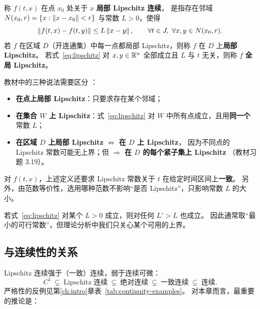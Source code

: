 \begin{definition}[局部 Lipschitz]\label{def:local-lipschitz}
  称 $f(t,x)$ 在点 $x_0$ 处关于 $x$ \textbf{局部 Lipschitz 连续}，
  是指存在邻域 $N(x_0,r)=\{x:\left\lVert x-x_0\right\rVert<r\}$ 与常数 $L>0$，使得
  \begin{equation}\label{eq:lipschitz}
    \left\lVert f(t,x)-f(t,y)\right\rVert\le L\left\lVert x-y\right\rVert,
    \qquad \forall t\in J,\ \forall x,y\in N(x_0,r).
  \end{equation}
  若 $f$ 在区域 $D$（开连通集）中每一点都局部 Lipschitz，则称 $f$ 在 $D$ 上\textbf{局部 Lipschitz}。
  若式~\eqref{eq:lipschitz} 对 $x,y\in\mathbb{R}^n$ 全部成立且 $L$ 与 $t$ 无关，则称 $f$ \textbf{全局 Lipschitz}。
\end{definition}

\begin{remark}[局部、集上与全局]\label{rem:lipschitz-terminology}
  教材中的三种说法需要区分 \cite[§3.1]{khalilNonlinearSystems}：
  \begin{itemize}
    \item \textbf{在点上局部 Lipschitz}：只要求存在某个邻域；
    \item \textbf{在集合 $W$ 上 Lipschitz}：式~\eqref{eq:lipschitz} 对 $W$ 中所有点成立，且用\textbf{同一个}常数 $L$；
    \item \textbf{在区域 $D$ 上局部 Lipschitz} $\not\Rightarrow$ \textbf{在 $D$ 上 Lipschitz}，
          因为不同点的 Lipschitz 常数可能无上界；但 $\Rightarrow$ \textbf{在 $D$ 的每个紧子集上 Lipschitz}
          （教材习题 3.19）。
  \end{itemize}
  对 $f(t,x)$，上述定义还要求 Lipschitz 常数关于 $t$ 在给定时间区间上\textbf{一致}。
  另外，由范数等价性，选用哪种范数不影响“是否 Lipschitz”，只影响常数 $L$ 的大小。
\end{remark}

\begin{remark}
  若式~\eqref{eq:lipschitz} 对某个 $L>0$ 成立，则对任何 $L'>L$ 也成立。
  因此通常取“最小的可行常数”，但理论分析中我们只关心某个可用的上界。
\end{remark}

\subsection{与连续性的关系}

Lipschitz 连续强于（一致）连续，弱于连续可微：
\begin{equation}
  C^1 \ \subsetneq\ \text{Lipschitz 连续}\ \subsetneq\ \text{绝对连续}\ \subsetneq\ \text{一致连续}\ \subsetneq\ \text{连续}.
\end{equation}
严格性的反例见第\ref{ch:intro}章表~\ref{tab:continuity-examples}。
对本章而言，最重要的推论是：

